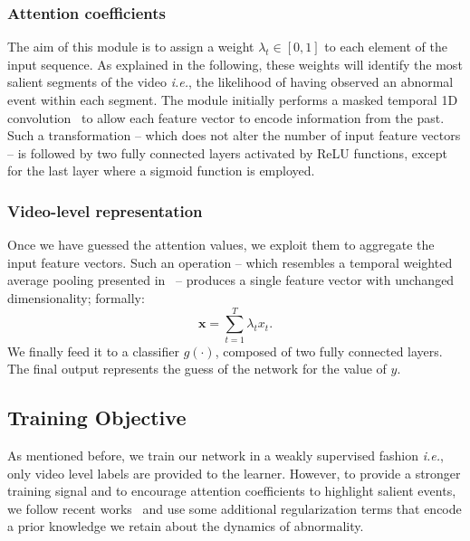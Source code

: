 \documentclass[runningheads]{llncs}
\begin{document}
\subsubsection{Attention coefficients} The aim of this module is to assign a weight $\lambda_t \in [0,1]$ to each element of the input sequence. As explained in the following, these weights will identify the most salient segments of the video \textit{i.e.}, the likelihood of having observed an abnormal event within each segment. The module initially performs a masked temporal 1D convolution~\cite{lea2017temporal} to allow each feature vector to encode information from the past. Such a transformation -- which does not alter the number of input feature vectors -- is followed by two fully connected layers activated by ReLU functions, except for the last layer where a sigmoid function is employed.
\subsubsection{Video-level representation} Once we have guessed the attention values, we exploit them to aggregate the input feature vectors. Such an operation -- which resembles a temporal weighted average pooling presented in~\cite{porrello2019spotting} -- produces a single feature vector with unchanged dimensionality; formally:
\begin{equation}
    \mathbf{x} = \sum_{t=1}^{T} \lambda_t x_t.
\end{equation}
We finally feed it to a classifier $g(\cdot)$, composed of two fully connected layers. The final output represents the guess of the network for the value of $y$.
\subsection{Training Objective} As mentioned before, we train our network in a weakly supervised fashion \textit{i.e.}, only video level labels are provided to the learner. However, to provide a stronger training signal and to encourage attention coefficients to highlight salient events, we follow recent works~\cite{cai2021appearance, yu2020cloze} and use some additional regularization terms that encode a prior knowledge we retain about the dynamics of abnormality.
\end{document}
